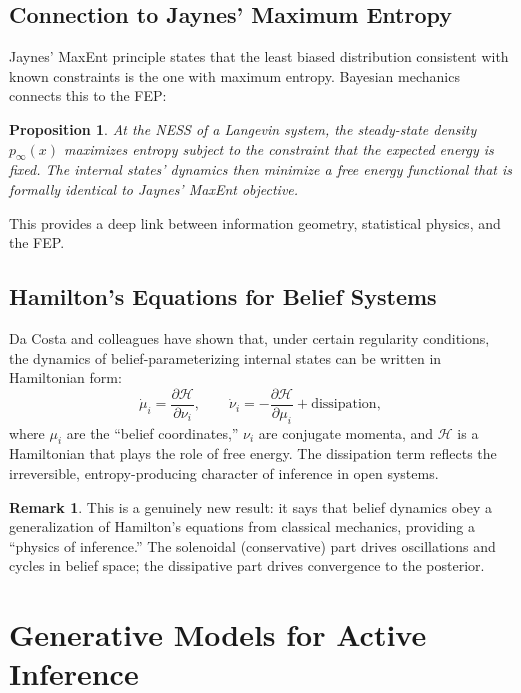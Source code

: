 \documentclass[11pt,a4paper]{article}
\newtheorem{proposition}[theorem]{Proposition}
\theoremstyle{definition}
\newtheorem{remark}[theorem]{Remark}
\begin{document}
\subsection{Connection to Jaynes' Maximum Entropy}

Jaynes' MaxEnt principle states that the least biased distribution consistent
with known constraints is the one with maximum entropy.  Bayesian mechanics
connects this to the FEP:

\begin{proposition}
At the NESS of a Langevin system, the steady-state density $p_\infty(x)$
maximizes entropy subject to the constraint that the expected energy is fixed.
The internal states' dynamics then minimize a free energy functional that is
formally identical to Jaynes' MaxEnt objective.
\end{proposition}

This provides a deep link between information geometry, statistical physics,
and the FEP.

\subsection{Hamilton's Equations for Belief Systems}

Da Costa and colleagues have shown that, under certain regularity conditions,
the dynamics of belief-parameterizing internal states can be written in
Hamiltonian form:
\begin{equation}
  \dot{\mu}_i = \frac{\partial \mathcal{H}}{\partial \nu_i},
  \qquad
  \dot{\nu}_i = -\frac{\partial \mathcal{H}}{\partial \mu_i} + \text{dissipation},
  \label{eq:hamilton_belief}
\end{equation}
where $\mu_i$ are the ``belief coordinates,'' $\nu_i$ are conjugate momenta,
and $\mathcal{H}$ is a Hamiltonian that plays the role of free energy.  The
dissipation term reflects the irreversible, entropy-producing character of
inference in open systems.

\begin{remark}
This is a genuinely new result: it says that belief dynamics obey a
generalization of Hamilton's equations from classical mechanics, providing a
``physics of inference.''  The solenoidal (conservative) part drives
oscillations and cycles in belief space; the dissipative part drives convergence
to the posterior.
\end{remark}


\section{Generative Models for Active Inference}
\label{sec:genmodels}
\end{document}
